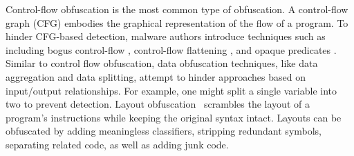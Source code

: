 Control-flow obfuscation is the most common type of obfuscation. A control-flow graph (CFG) \cite{CFG} embodies the graphical
representation of the flow of a program. To hinder CFG-based detection, malware authors introduce techniques such as including bogus control-flow \cite{li2021code}, control-flow flattening \cite{cfg_f}, and opaque predicates \cite{xu2018opaque}. 
Similar to control flow obfuscation, data obfuscation techniques, like data aggregation and data
splitting, attempt to hinder approaches based on input/output relationships. For example, one might split a single variable into two to prevent detection.
%
%
%
%
%
%
Layout obfuscation~\cite{xu2020layered} scrambles the layout of a program's instructions while keeping the original syntax intact. Layouts can be obfuscated by adding meaningless classifiers, stripping redundant symbols, separating related code, as well as adding junk code.


